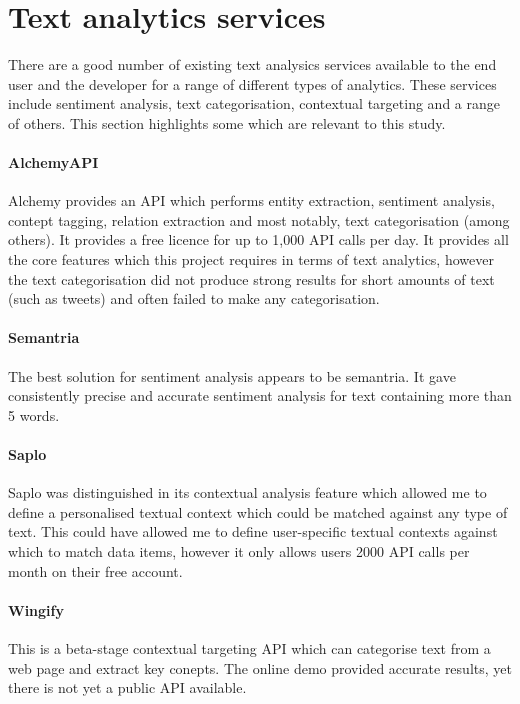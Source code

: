 \section{Text analytics services}

There are a good number of existing text analysics services available to the end user and the developer for a range of different types of analytics. These services include sentiment analysis, text categorisation, contextual targeting and a range of others. This section highlights some which are relevant to this study.

\paragraph{AlchemyAPI}
Alchemy provides an API which performs entity extraction, sentiment analysis, contept tagging, relation extraction and most notably, text categorisation (among others). It provides a free licence for up to 1,000 API calls per day. It provides all the core features which this project requires in terms of text analytics, however the text categorisation did not produce strong results for short amounts of text (such as tweets) and often failed to make any categorisation.

\paragraph{Semantria}
The best solution for sentiment analysis appears to be semantria. It gave consistently precise and accurate sentiment analysis for text containing more than 5 words. 

\paragraph{Saplo}
Saplo was distinguished in its contextual analysis feature which allowed me to define a personalised textual context which could be matched against any type of text. This could have allowed me to define user-specific textual contexts against which to match data items, however it only allows users 2000 API calls per month on their free account.

\paragraph{Wingify}
This is a beta-stage contextual targeting API which can categorise text from a web page and extract key conepts. The online demo provided accurate results, yet there is not yet a public API available.

